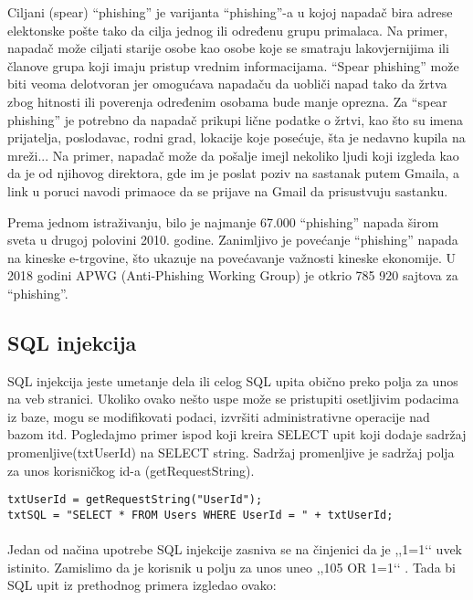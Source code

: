 \documentclass[a4paper]{article}
\begin{document}
Ciljani (spear) “phishing” je varijanta “phishing”-a u kojoj napadač bira adrese elektonske pošte tako da cilja jednog ili određenu grupu primalaca. Na primer, napadač može ciljati starije osobe kao osobe koje se smatraju lakovjernijima ili članove grupa
koji imaju pristup vrednim informacijama. “Spear phishing” može biti veoma delotvoran jer omogućava napadaču da uobliči napad tako da žrtva zbog hitnosti ili poverenja određenim osobama bude manje oprezna. Za “spear phishing” je potrebno da napadač prikupi lične podatke o žrtvi, kao što su imena prijatelja, poslodavac, rodni grad, lokacije koje posećuje, šta je nedavno kupila na mreži...
Na primer, napadač može da pošalje imejl nekoliko ljudi koji izgleda kao da je od njihovog direktora, gde im je poslat poziv na sastanak putem Gmaila, a link u poruci navodi primaoce da se prijave na Gmail da prisustvuju sastanku. 
 
Prema jednom istraživanju, bilo je najmanje 67.000 “phishing” napada širom sveta u drugoj polovini 2010. godine. Zanimljivo
je povećanje “phishing” napada na kineske e-trgovine, što ukazuje na povećavanje važnosti kineske ekonomije. U 2018 godini
APWG (Anti-Phishing Working Group) je otkrio 785 920 sajtova za “phishing”.

\subsection{SQL injekcija}
\label{subsec:sql}

SQL injekcija jeste umetanje dela ili celog SQL upita obično preko polja za unos na veb stranici. Ukoliko ovako nešto uspe može se pristupiti osetljivim podacima iz baze, mogu se modifikovati podaci, izvršiti administrativne operacije nad bazom itd. Pogledajmo primer ispod koji kreira SELECT upit koji dodaje sadržaj promenljive(txtUserId) na SELECT string. Sadržaj promenljive je sadržaj polja za unos korisničkog id-a (getRequestString).
\begin{verbatim}
txtUserId = getRequestString("UserId");
txtSQL = "SELECT * FROM Users WHERE UserId = " + txtUserId;
\end{verbatim}

\paragraph{}
Jedan od načina upotrebe SQL injekcije zasniva se na činjenici da je ,,1=1‘‘ uvek istinito. Zamislimo da je korisnik u polju za unos uneo ,,105 OR 1=1‘‘ . Tada bi SQL upit iz prethodnog primera izgledao ovako:
\end{document}
